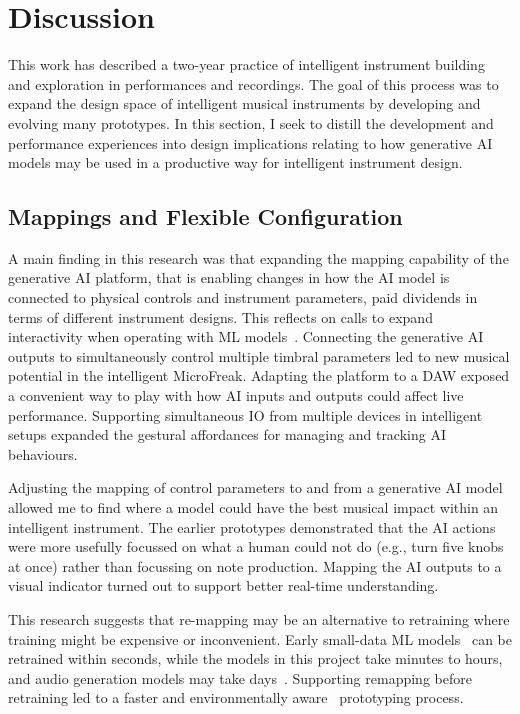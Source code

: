 \documentclass[sigconf]{nimeart}
\begin{document}
\section{Discussion}

This work has described a two-year practice of intelligent instrument building and exploration in performances and recordings. The goal of this process was to expand the design space of intelligent musical instruments by developing and evolving many prototypes. 
In this section, I seek to distill the development and performance experiences into design implications relating to how generative AI models may be used in a productive way for intelligent instrument design.

\subsection{Mappings and Flexible Configuration}

A main finding in this research was that expanding the mapping capability of the generative AI platform, that is enabling changes in how the AI model is connected to physical controls and instrument parameters, paid dividends in terms of different instrument designs. 
This reflects on calls to expand interactivity when operating with ML models~\cite{jourdan_nime_ml_review}. 
Connecting the generative AI outputs to simultaneously control multiple timbral parameters led to new musical potential in the intelligent MicroFreak. Adapting the platform to a DAW exposed a convenient way to play with how AI inputs and outputs could affect live performance. Supporting simultaneous IO from multiple devices in intelligent setups expanded the gestural affordances for managing and tracking AI behaviours.

Adjusting the mapping of control parameters to and from a generative AI model allowed me to find where a model could have the best musical impact within an intelligent instrument. 
The earlier prototypes demonstrated that the AI actions were more usefully focussed on what a human could not do (e.g., turn five knobs at once) rather than focussing on note production. 
Mapping the AI outputs to a visual indicator turned out to support better real-time understanding.

This research suggests that re-mapping may be an alternative to retraining where training might be expensive or inconvenient. 
Early small-data ML models~\cite{fiebrink_years_ml} can be retrained within seconds, while the models in this project take minutes to hours, and audio generation models may take days~\cite{stefansdottir_intelligent_2025}. 
Supporting remapping before retraining led to a faster and environmentally aware~\cite{sustainable-internet-of-musical-things} prototyping process.
\end{document}
